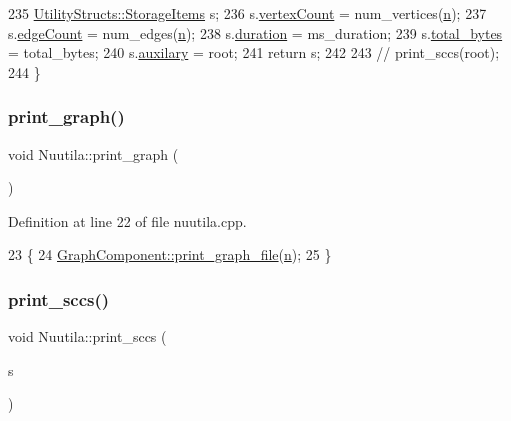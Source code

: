 \begin{DoxyCode}
235     \hyperlink{struct_utility_structs_1_1_storage_items}{UtilityStructs::StorageItems} s;
236     s.\hyperlink{struct_utility_structs_1_1_storage_items_af72522be713f23fcfe3ac66780183fda}{vertexCount} = num\_vertices(\hyperlink{class_nuutila_a1409929fa0f38709497f8bdb012af71c}{n});
237     s.\hyperlink{struct_utility_structs_1_1_storage_items_afafcba9bb103108e2c1e1d9254fb75c5}{edgeCount} = num\_edges(\hyperlink{class_nuutila_a1409929fa0f38709497f8bdb012af71c}{n});
238     s.\hyperlink{struct_utility_structs_1_1_storage_items_a65e7df5611a4e144cc27576bd3041f6c}{duration} = ms\_duration;
239     s.\hyperlink{struct_utility_structs_1_1_storage_items_a39cf482db54d8e6ac473b438444c8a1e}{total\_bytes} = total\_bytes;
240     s.\hyperlink{struct_utility_structs_1_1_storage_items_afb9d346eaacb1c5e7f60f559c45910f2}{auxilary} = root;
241     \textcolor{keywordflow}{return} s;
242 
243     \textcolor{comment}{// print\_sccs(root);}
244 \}
\end{DoxyCode}
\mbox{\label{class_nuutila_a0dc1cb3d0711a856a32a3743a85fb5c8}} 
\subsubsection{\texorpdfstring{print\+\_\+graph()}{print\_graph()}}
{\footnotesize\ttfamily void Nuutila\+::print\+\_\+graph (\begin{DoxyParamCaption}{ }\end{DoxyParamCaption})}



Definition at line 22 of file nuutila.\+cpp.


\begin{DoxyCode}
23 \{
24     \hyperlink{class_graph_component_a6af293dac3774fde0e2822b5725ecacd}{GraphComponent::print\_graph\_file}(\hyperlink{class_nuutila_a1409929fa0f38709497f8bdb012af71c}{n});
25 \}
\end{DoxyCode}
\mbox{\label{class_nuutila_ae11b94c396dff5b8d9b7f69ae0d0831f}} 
\subsubsection{\texorpdfstring{print\+\_\+sccs()}{print\_sccs()}}
{\footnotesize\ttfamily void Nuutila\+::print\+\_\+sccs (\begin{DoxyParamCaption}\item[{\hyperlink{struct_utility_structs_1_1_storage_items}{Utility\+Structs\+::\+Storage\+Items} \&}]{s }\end{DoxyParamCaption})}



